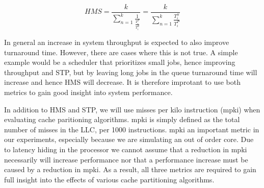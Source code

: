 \begin{equation} \label{eq:HMS}
 HMS = \frac{k}{{\sum\limits_{n=1}^{k}}\frac{1}{\frac{T^{P}_i}{T^{S}_i}}} = \frac{k}{{\sum\limits_{n=1}^{k}}\frac{T^{S}_i}{T^{P}_i}}
\end{equation}

In general an increase in system throughput is expected to also improve turnaround time.
However, there are cases where this is not true.
A simple example would be a scheduler that prioritizes small jobs, hence improving throughput and STP, but by leaving long jobs in the queue turnaround time will increase and hence HMS will decrease.
It is therefore improtant to use both metrics to gain good insight into system performance.

In addition to HMS and STP, we will use misses per kilo instruction (mpki) when evaluating cache paritioning algorithms.
mpki is simply defined as the total number of misses in the LLC, per 1000 instructions.
mpki an important metric in our experiments, especially because we are simulating an out of order core. 
Due to latency hiding in the processor we cannot assume that a reduction in mpki necessarily will increase performance nor that a performance increase must be caused by a reduction in mpki.
As a result, all three metrics are required to gain full insight into the effects of various cache partitioning algorithms.